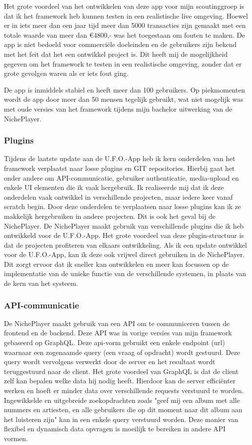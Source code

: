Het grote voordeel van het ontwikkelen van deze app voor mijn scoutinggroep is dat ik het framework heb kunnen testen in een realistische live omgeving. Hoewel er in iets meer dan een jaar tijd meer dan 5000 transacties zijn gemaakt met een totale waarde van meer dan €4800,- was het toegestaan om fouten te maken. De app is niet bedoeld voor commerciële doeleinden en de gebruikers zijn bekend met het feit dat het een ontwikkel project is. Dit heeft mij de mogelijkheid gegeven om het framework te testen in een realistische omgeving, zonder dat er grote gevolgen waren als er iets fout ging.

De app is inmiddels stabiel en heeft meer dan 100 gebruikers. Op piekmomenten wordt de app door meer dan 50 mensen tegelijk gebruikt, wat niet mogelijk was met oude versies van het framework tijdens mijn bachelor uitwerking van de NichePlayer.

\subsubsection*{Plugins}
Tijdens de laatste update aan de U.F.O.-App heb ik kern onderdelen van het framework verplaatst naar losse plugins en GIT repositories. Hierbij gaat het onder andere om API-communicatie, gebruiker authenticatie, media-upload en enkele UI elementen die ik vaak hergebruik. Ik realiseerde mij dat ik deze onderdelen vaak ontwikkel in verschillende projecten, maar iedere keer vanaf scratch begin. Door deze onderdelen te verplaatsen naar losse plugins kan ik ze makkelijk hergebruiken in andere projecten. Dit is ook het geval bij de NichePlayer. De NichePlayer maakt gebruik van verschillende plugins die ik heb ontwikkeld voor de U.F.O.-App. Het grote voordeel van deze plugin-structuur is dat de projecten profiteren van elkaars ontwikkeling. Als ik een update ontwikkel voor de U.F.O.-App, kan ik deze ook vrijwel direct gebruiken in de NichePlayer. Dit zorgt ervoor dat ik sneller kan ontwikkelen en meer kan focussen op de implementatie van de unieke functie van de verschillende systemen, in plaats van de kern van het systeem.

\subsubsection*{API-communicatie}
De NichePlayer maakt gebruik van een API om te communiceren tussen de frontend en de backend. Deze API was in vorige versies van mijn framework gebaseerd op GraphQL. Deze api-vorm gebruikt een enkele endpoint (url) waarnaar een zogenaamde query (een vraag of opdracht) wordt gestuurd. Deze query wordt vervolgens verwerkt door de server en het resultaat wordt teruggestuurd naar de client. Het grote voordeel van GraphQL is dat de client zelf kan bepalen welke data hij nodig heeft. Hierdoor kan de server efficiënter werken en hoeft er minder data over verschillende requests verstuurd te worden. Ingewikkelde en uitgebreide zoekopdrachten zoals "geef mij een album met alle nummers en artiesten, en alle gebruikers die op dit moment naar dit album aan het luisteren zijn" kan in een enkele query verstuurd worden. Deze manier van flexibel en dynamisch data opvragen is moeilijk te bereiken in andere API vormen.

